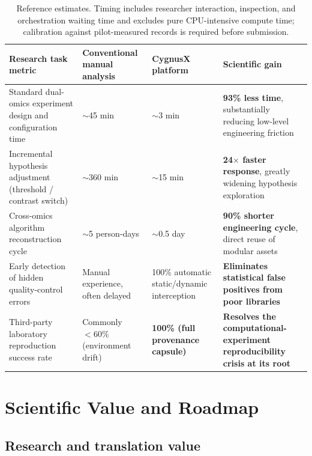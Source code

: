 \documentclass[11pt,a4paper]{article}
\begin{document}
\begin{table}[htbp]
\centering
\renewcommand{\arraystretch}{1.25}
\begin{tabularx}{\textwidth}{p{}X X X}
\toprule
\textbf{Research task metric} & \textbf{Conventional manual analysis} & \textbf{CygnusX platform} & \textbf{Scientific gain}\\
\midrule
Standard dual-omics experiment design and configuration time & $\sim$45 min & $\sim$3 min & \textbf{93\% less time}, substantially reducing low-level engineering friction\\
Incremental hypothesis adjustment (threshold / contrast switch) & $\sim$360 min & $\sim$15 min & \textbf{24$\times$ faster response}, greatly widening hypothesis exploration\\
Cross-omics algorithm reconstruction cycle & $\sim$5 person-days & $\sim$0.5 day & \textbf{90\% shorter engineering cycle}, direct reuse of modular assets\\
Early detection of hidden quality-control errors & Manual experience, often delayed & 100\% automatic static/dynamic interception & \textbf{Eliminates statistical false positives from poor libraries}\\
Third-party laboratory reproduction success rate & Commonly $< 60\%$ (environment drift) & \textbf{100\% (full provenance capsule)} & \textbf{Resolves the computational-experiment reproducibility crisis at its root}\\
\bottomrule
\end{tabularx}
\caption{Reference estimates. Timing includes researcher interaction, inspection, and orchestration waiting time and excludes pure CPU-intensive compute time; calibration against pilot-measured records is required before submission.}
\end{table}

\section{Scientific Value and Roadmap}

\subsection{Research and translation value}
\end{document}
